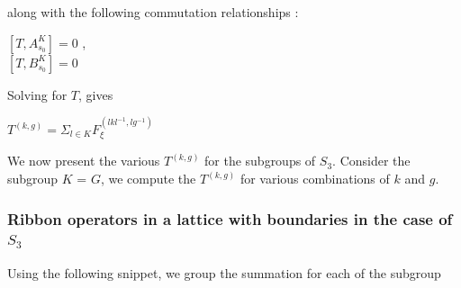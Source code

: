 along with the following commutation relationships :
\begin{center}
        $[T, A^{K}_{s_{0}}] = 0$ , \\
        $[T, B^{K}_{s_{0}}] = 0$
\end{center}

Solving for $T$, gives 
\begin{center}
    $T^{(k,g)} = \varSigma_{l \in K} F^{(lkl^{-1},lg^{-1})}_{\xi}$ 
\end{center}

We now present the various $T^{(k,g)}$ for the subgroups of $S_{3}$. Consider the subgroup 
$K$ = $G$, we compute the $T^{(k,g)}$ for various combinations of $k$ and $g$.

\subsubsection{Ribbon operators in a lattice with boundaries in the case of $S_{3}$}
Using the following snippet, we group the summation for each of the subgroup 
